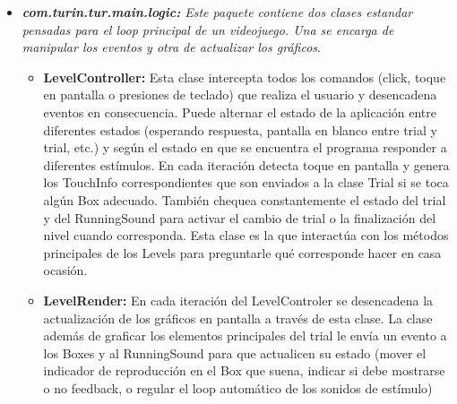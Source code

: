 \documentclass{article}
\numberwithin{figure}{section}
\begin{document}
\begin{itemize}
         \item \textit{\textbf{com.turin.tur.main.logic:} Este paquete contiene dos clases estandar pensadas para el loop principal de un videojuego. Una se encarga de manipular los eventos y otra de actualizar los gráficos}.
         \begin{itemize}
             \item \textbf{LevelController:} Esta clase intercepta todos los comandos (click, toque en pantalla o presiones de teclado) que realiza el usuario y desencadena eventos en consecuencia. Puede alternar el estado de la aplicación entre diferentes estados (esperando respuesta, pantalla en blanco entre trial y trial, etc.) y según el estado en que se encuentra el programa responder a diferentes estímulos. En cada iteración detecta toque en pantalla y genera los TouchInfo correspondientes que son enviados a la clase Trial si se toca algún Box adecuado. También chequea constantemente el estado del trial y del RunningSound para activar el cambio de trial o la finalización del nivel cuando corresponda. Esta clase es la que interactúa con los métodos principales de los Levels para preguntarle qué corresponde hacer en casa ocasión. 
             \item \textbf{LevelRender:} En cada iteración del LevelControler se desencadena la actualización de los gráficos en pantalla a través de esta clase. La clase además de graficar los elementos principales del trial le envía un evento a los Boxes y al RunningSound para que actualicen su estado (mover el indicador de reproducción en el Box que suena, indicar si debe mostrarse o no feedback, o regular el loop automático de los sonidos de estímulo)
         \end{itemize}
        

\end{itemize}
\end{document}
